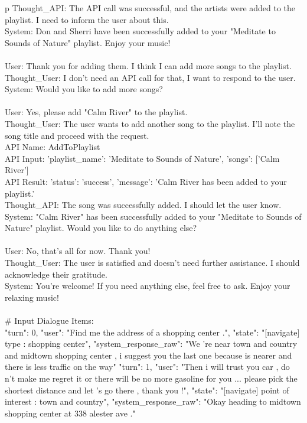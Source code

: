 \begin{table*}
\begin{tabular}{p\linewidth}
Thought\_API: The API call was successful, and the artists were added to the playlist. I need to inform the user about this.   \\
System: Don and Sherri have been successfully added to your "Meditate to Sounds of Nature" playlist. Enjoy your music!   \\
 \\
User: Thank you for adding them. I think I can add more songs to the playlist. \\
Thought\_User: I don't need an API call for that, I want to respond to the user.  \\
System: Would you like to add more songs?   \\
 \\
User: Yes, please add "Calm River" to the playlist.   \\
Thought\_User: The user wants to add another song to the playlist. I'll note the song title and proceed with the request.   \\
API Name: AddToPlaylist   \\
API Input: {'playlist\_name': 'Meditate to Sounds of Nature', 'songs': ['Calm River']}   \\
API Result: {'status': 'success', 'message': 'Calm River has been added to your playlist.'}   \\
Thought\_API: The song was successfully added. I should let the user know.   \\
System: "Calm River" has been successfully added to your "Meditate to Sounds of Nature" playlist. Would you like to do anything else?   \\
 \\
User: No, that's all for now. Thank you!   \\
Thought\_User: The user is satisfied and doesn't need further assistance. I should acknowledge their gratitude.   \\
System: You're welcome! If you need anything else, feel free to ask. Enjoy your relaxing music! \\
 \\
\# Input Dialogue Items: \\
{"turn": 0, "user": "Find me the address of a shopping center .", "state": "[navigate] type : shopping center", "system\_response\_raw": "We 're near town and country and midtown shopping center , i suggest you the last one because is nearer and there is less traffic on the way"}
{"turn": 1, "user": "Then i will trust you car , do n't make me regret it or there will be no more gasoline for you ... please pick the shortest distance and let 's go there , thank you !", "state": "[navigate] point of interest : town and country", "system\_response\_raw": "Okay heading to midtown shopping center at 338 alester ave ."}\\ \bottomrule
\end{tabular}
\end{table*}